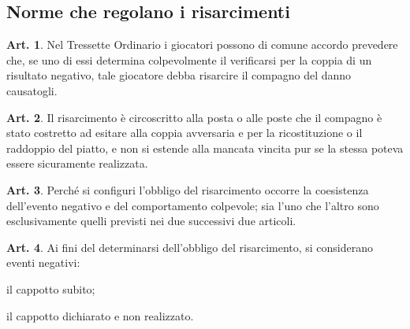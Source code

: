 \documentclass[italian,a4paper]{book}
\theoremstyle{definition}
\newtheorem{art}{Art.}
\begin{document}
\subsection{Norme che regolano i risarcimenti}
\begin{art}
Nel Tressette Ordinario i giocatori possono di comune accordo prevedere che, se uno di essi determina colpevolmente il verificarsi per la coppia di un risultato negativo, tale giocatore debba risarcire il compagno del danno causatogli.
\end{art}
\begin{art}
Il risarcimento è circoscritto alla posta o alle poste che il compagno è stato costretto ad esitare alla coppia avversaria e per la ricostituzione o il raddoppio del piatto, e non si estende alla mancata vincita pur se la stessa poteva essere sicuramente realizzata.
\end{art}
\begin{art}
Perché si configuri l'obbligo del risarcimento occorre la coesistenza dell'evento negativo e del comportamento colpevole; sia l'uno che l'altro sono esclusivamente quelli previsti nei due successivi due articoli.
\end{art}
\begin{art}
Ai fini del determinarsi dell'obbligo del risarcimento, si considerano eventi negativi:
\item  il cappotto subito;
\item  il cappotto dichiarato e non realizzato.
\end{art}
\end{document}

